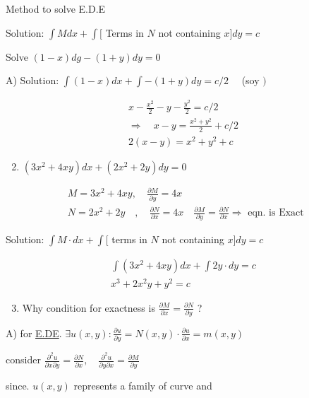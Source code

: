 \documentclass[12pt, a4paper]{article}
\begin{document}
Method to solve E.D.E

Solution: $\int M d x+\int[$ Terms in $N$ not containing $x] d y=c$

Solve $(1-x) d g-(1+y) d y=0$

A) Solution: $\int(1-x) d x+\int-(1+y) d y=c / 2 \quad$ (soy $)$

$$
\begin{gathered}
x-\frac{x^{2}}{2}-y-\frac{y^{2}}{2}=c / 2 \\
\Rightarrow \quad x-y=\frac{x^{2}+y^{2}}{2}+c / 2 \\
2(x-y)=x^{2}+y^{2}+c
\end{gathered}
$$

\begin{enumerate}
  \setcounter{enumi}{1}
  \item $\left(3 x^{2}+4 x y\right) d x+\left(2 x^{2}+2 y\right) d y=0$
\end{enumerate}

$$
\begin{aligned}
& M=3 x^{2}+4 x y, \quad \frac{\partial M}{\partial y}=4 x \\
& N=2 x^{2}+2 y \quad, \quad \frac{\partial N}{\partial x}=4 x \quad \frac{\partial M}{\partial y}=\frac{\partial N}{\partial x} \Rightarrow \text { eqn. is Exact }
\end{aligned}
$$

Solution: $\int M \cdot d x+\int[$ terms in $N$ not containing $x] d y=c$

$$
\begin{gathered}
\int\left(3 x^{2}+4 x y\right) d x+\int 2 y \cdot d y=c \\
x^{3}+2 x^{2} y+y^{2}=c
\end{gathered}
$$

\begin{enumerate}
  \setcounter{enumi}{2}
  \item Why condition for exactness is $\frac{\partial M}{\partial x}=\frac{\partial N}{\partial y}$ ?
\end{enumerate}

A) for \href{http://E.DE}{E.DE}. $\exists u(x, y): \frac{\partial u}{\partial y}=N(x, y) \cdot \frac{\partial u}{\partial x}=m(x, y)$

consider $\frac{\partial^{2} u}{\partial x \partial y}=\frac{\partial N}{\partial x}, \quad \frac{\partial^{2} u}{\partial y \partial x}=\frac{\partial M}{\partial y}$

since. $u(x, y)$ represents a family of curve and
\end{document}
